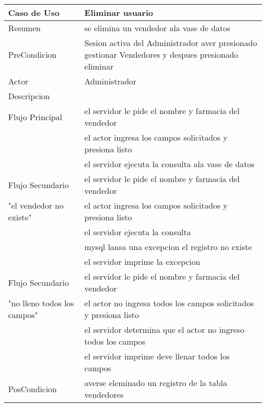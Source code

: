 \documentclass{book}
\begin{document}
	\begin{table}[H]
		\centering
		\begin{tabular}{p{3cm} p{11cm}}
			\hline
				Caso de Uso & Eliminar usuario\\
			\hline 
				Resumen & se elimina un vendedor ala vase de datos\\
			\hline
				PreCondicion&Sesion activa del Administrador aver presionado gestionar Vendedores y despues presionado eliminar\\
			\hline
				Actor & Administrador\\
			\hline
				Descripcion&\\
				Flujo Principal&el servidor le pide el nombre y farmacia del vendedor
					\\&el actor ingresa los campos solicitados y presiona listo
					\\&el servidor ejecuta la consulta ala vase de datos\\
			\hline
				Flujo Secundario&el servidor le pide el nombre y farmacia del vendedor\\
				"el vendedor no existe"&el actor ingresa los campos solicitados y presiona listo
				\\&el servidor ejecuta la consulta
				\\&mysql lansa una excepcion el registro no existe
				\\&el servidor imprime la excepcion\\
			\hline
				Flujo Secundario&el servidor le pide el nombre y farmacia del vendedor\\
				"no lleno todos los campos"&el actor no ingresa todos los campos solicitados y presiona listo
				\\&el servidor determina que el actor no ingreso todos los campos
				\\&el servidor imprime deve llenar todos los campos\\
			\hline
				PosCondicion&averse eleminado un registro de la tabla vendedores\\
			\hline
		\end{tabular}
	\end{table}
	
\end{document}
